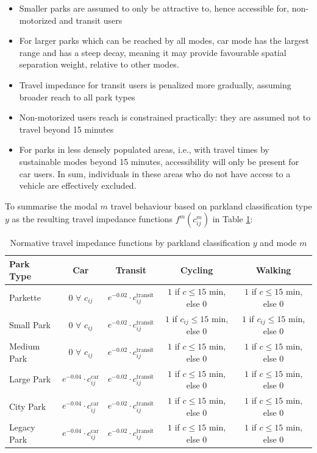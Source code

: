 \documentclass[
11pt, %
oneside, %
english, %
singlespacing, %
]{macthesis} %
\def\tightlist{}
\begin{document}
\begin{itemize}
\tightlist
\item
  Smaller parks are assumed to only be attractive to, hence accessible for, non-motorized and transit users
\item
  For larger parks which can be reached by all modes, car mode has the largest range and has a steep decay, meaning it may provide favourable spatial separation weight, relative to other modes.
\item
  Travel impedance for transit users is penalized more gradually, assuming broader reach to all park types
\item
  Non-motorized users reach is constrained practically: they are assumed not to travel beyond 15 minutes
\item
  For parks in less densely populated areas, i.e., with travel times by sustainable modes beyond 15 minutes, accessibility will only be present for car users. In sum, individuals in these areas who do not have access to a vehicle are effectively excluded.
\end{itemize}

To summarise the modal \(m\) travel behaviour based on parkland classification type \(y\) as the resulting travel impedance functions \(f^m(c^m_{ij})\) in Table \ref{tab:chp3-travel-impedance-by-park-mode}:

\begin{table}[ht]
\centering
\small
\begin{tabular}{|l|c|c|c|c|}
\hline
\textbf{Park Type} & \textbf{Car} & \textbf{Transit} & \textbf{Cycling} & \textbf{Walking} \\
\hline
Parkette &
0 $\forall$ $c_{ij}$ &
$e^{-0.02} \cdot c_{ij}^{\text{transit}}$ &
$1$ if $c \leq 15$ min, else 0 &
$1$ if $c \leq 15$ min, else 0 \\
\hline
Small Park &
0 $\forall$ $c_{ij}$ &
$e^{-0.02} \cdot c_{ij}^{\text{transit}}$ &
$1$ if $c_{ij} \leq 15$ min, else 0 &
$1$ if $c_{ij} \leq 15$ min, else 0 \\
\hline
Medium Park &
0 $\forall$ $c_{ij}$ &
$e^{-0.02} \cdot c_{ij}^{\text{transit}}$ &
$1$ if $c \leq 15$ min, else 0 &
$1$ if $c \leq 15$ min, else 0 \\
\hline
Large Park &
$e^{-0.04} \cdot c_{ij}^{\text{car}}$ &
$e^{-0.02} \cdot c_{ij}^{\text{transit}}$ &
$1$ if $c \leq 15$ min, else 0 &
$1$ if $c \leq 15$ min, else 0 \\
\hline
City Park &
$e^{-0.04} \cdot c_{ij}^{\text{car}}$ &
$e^{-0.02} \cdot c_{ij}^{\text{transit}}$ &
$1$ if $c \leq 15$ min, else 0 &
$1$ if $c \leq 15$ min, else 0 \\
\hline
Legacy Park &
$e^{-0.04} \cdot c_{ij}^{\text{car}}$ &
$e^{-0.02} \cdot c_{ij}^{\text{transit}}$ &
$1$ if $c \leq 15$ min, else 0 &
$1$ if $c \leq 15$ min, else 0 \\
\hline
\end{tabular}
\caption{Normative travel impedance functions by parkland classification $y$ and mode $m$}
\label{tab:chp3-travel-impedance-by-park-mode}
\end{table}
\end{document}
